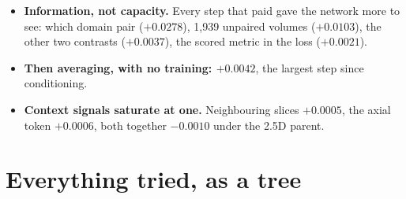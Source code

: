 \documentclass[10pt,a4paper]{article}
\begin{document}
\begin{itemize}
  \item \textbf{Information, not capacity.} Every step that paid gave the network more to see:
        which domain pair ($+0.0278$), 1{,}939 unpaired volumes ($+0.0103$), the other two
        contrasts ($+0.0037$), the scored metric in the loss ($+0.0021$).
  \item \textbf{Then averaging, with no training: $+0.0042$}, the largest step since
        conditioning.
  \item \textbf{Context signals saturate at one.} Neighbouring slices $+0.0005$, the axial token
        $+0.0006$, both together $-0.0010$ under the 2.5D parent.
\end{itemize}

\section{Everything tried, as a tree}\label{sec:tree}
\end{document}
